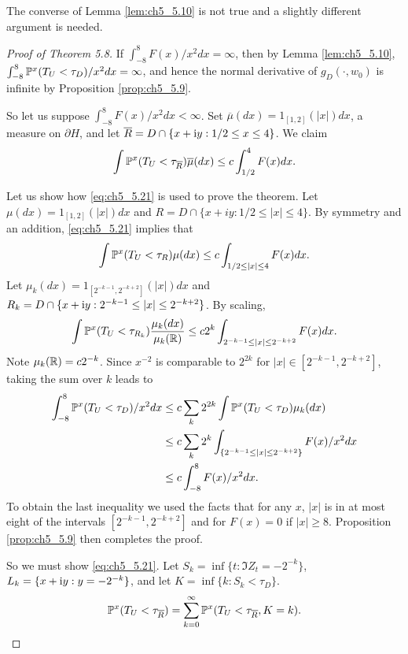 The converse of Lemma \ref{lem:ch5_5.10} is not true and a slightly different argument is needed.

\begin{proof}[Proof of Theorem 5.8]
If $\int_{-8}^8 F(x)/x^2dx = \infty$, then by Lemma \ref{lem:ch5_5.10}, $\int_{-8}^8 \P^x(T_U < \tau_D)/x^2dx = \infty$, and hence the normal derivative of $g_D(\cdot,w_0)$ is infinite by Proposition \ref{prop:ch5_5.9}.

So let us suppose $\int_{-8}^8 F(x)/x^2dx < \infty$. Set $\overline{\mu}(dx) = 1_{[1,2]}(|x|)dx$, a measure on $\partial H$, and let $\overline{R} = D \cap \{x + \im y : 1/2 \leq x \leq 4\}$. We claim
\begin{equation}\label{eq:ch5_5.21}
    \int \P^x(T_U < \tau_{\overline{R}})\overline{\mu}(dx) \leq c \int_{1/2}^4 F(x)dx.
\end{equation}

Let us show how \eqref{eq:ch5_5.21} is used to prove the theorem. Let $\mu(dx) = 1_{[1,2]}(|x|)dx$ and $R = D \cap \{x + iy : 1/2 \leq |x| \leq 4\}$. By symmetry and an addition, \eqref{eq:ch5_5.21} implies that
\[
    \int \P^x(T_U < \tau_R)\mu(dx) \leq c \int_{1/2 \leq |x| \leq 4} F(x)dx.
\]
Let $\mu_k(dx) = 1_{[2^{-k-1},2^{-k+2}]}(|x|)dx$ and $R_k = D \cap \{x + \im y : 2^{-k-1} \leq |x| \leq 2^{-k+2}\}$. By scaling,
\[
    \int \P^x(T_U < \tau_{R_k})\frac{\mu_k(dx)}{\mu_k(\R)} \leq c2^k \int_{2^{-k-1} \leq |x| \leq 2^{-k+2}} F(x)dx.
\]
Note $\mu_k(\R) = c2^{-k}$. Since $x^{-2}$ is comparable to $2^{2k}$ for $|x| \in [2^{-k-1},2^{-k+2}]$, taking the sum over $k$ leads to
\mpagebreak
\begin{align*}
    \int_{-8}^8 \P^x(T_U < \tau_D)/x^2dx &\leq c\sum_k 2^{2k} \int \P^x(T_U < \tau_D)\mu_k(dx) \\
    &\leq c\sum_{k} 2^k \int_{\{2^{-k-1} \leq |x| \leq 2^{-k+2}\}} F(x)/x^2dx \\
    &\leq c\int_{-8}^8 F(x)/x^2dx.
\end{align*}
To obtain the last inequality we used the facts that for any $x$, $|x|$ is in at most eight of the intervals $[2^{-k-1},2^{-k+2}]$ and for $F(x)=0$ if $|x|\ge 8$. Proposition \ref{prop:ch5_5.9} then completes the proof.

So we must show \eqref{eq:ch5_5.21}. Let $S_k = \inf\{t : \Im Z_t = -2^{-k}\}$, $L_k = \{x+\im y : y = -2^{-k}\}$, and let $K = \inf\{k : S_k < \tau_D\}$.
\begin{equation}\label{eq:ch5_5.22}
    \P^x(T_U < \tau_{\overline{R}}) = \sum_{k=0}^{\infty} \P^x(T_U < \tau_{\overline{R}}, K = k).
\end{equation}


\end{proof}
